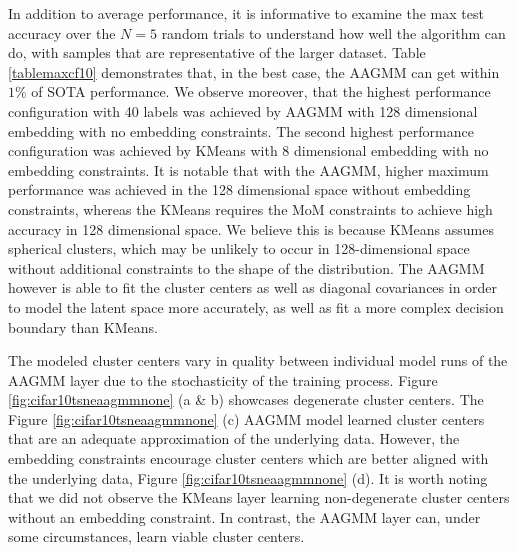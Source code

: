 \documentclass[10pt,twocolumn,letterpaper]{article}
\begin{document}
In addition to average performance, it is informative to examine the max test accuracy over the $N=5$ random trials to understand how well the algorithm can do, with samples that are representative of the larger dataset.
Table \ref{tablemaxcf10} demonstrates that, in the best case, the AAGMM can get within $1\%$ of SOTA \cite{zheng2023simmatchv2} performance.  We observe moreover, that the highest performance configuration with 40 labels was achieved by AAGMM with 128 dimensional embedding with no embedding constraints.  The second highest performance configuration was achieved by KMeans with 8 dimensional embedding with no embedding constraints.  It is notable that with the AAGMM, higher maximum performance was achieved in the 128 dimensional space without embedding constraints, whereas the KMeans requires the MoM constraints to achieve high accuracy in 128 dimensional space.  We believe this is because KMeans assumes spherical clusters, which may be unlikely to occur in 128-dimensional space without additional constraints to the shape of the distribution.  The AAGMM however is able to fit the cluster centers as well as diagonal covariances in order to model the latent space more accurately, as well as fit a more complex decision boundary than KMeans.

The modeled cluster centers vary in quality between individual model runs of the AAGMM layer due to the stochasticity of the training process.
Figure \ref{fig:cifar10tsneaagmmnone} (a \& b) showcases degenerate cluster centers.
The Figure \ref{fig:cifar10tsneaagmmnone} (c) AAGMM model learned cluster centers that are an adequate approximation of the underlying data.
However, the embedding constraints encourage cluster centers which are better aligned with the underlying data, Figure \ref{fig:cifar10tsneaagmmnone} (d).
It is worth noting that we did not observe the KMeans layer learning non-degenerate cluster centers without an embedding constraint.
In contrast, the AAGMM layer can, under some circumstances, learn viable cluster centers.
\end{document}
